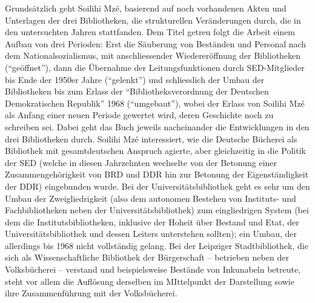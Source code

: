 \documentclass[a4paper,
fontsize=11pt,
oneside,
numbers=noperiodatend,
parskip=half-,
bibliography=totoc,
final
]{scrartcl}
\begin{document}
Grundsätzlich geht Soilihi Mzé, basierend auf noch vorhandenen Akten und
Unterlagen der drei Bibliotheken, die strukturellen Veränderungen durch,
die in den untersuchten Jahren stattfanden. Dem Titel getreu folgt die
Arbeit einem Aufbau von drei Perioden: Erst die Säuberung von Beständen
und Personal nach dem Nationalsozialismus, mit anschliessender
Wiedereröffnung der Bibliotheken (``geöffnet''), dann die Übernahme der
Leitungsfunktionen durch SED-Mitglieder bis Ende der 1950er Jahre
(``gelenkt'') und schliesslich der Umbau der Bibliotheken bis zum Erlass
der ``Bibliotheksverordnung der Deutschen Demokratischen Republik'' 1968
(``umgebaut''), wobei der Erlass von Soilihi Mzé als Anfang einer neuen
Periode gewertet wird, deren Geschichte noch zu schreiben sei. Dabei
geht das Buch jeweils nacheinander die Entwicklungen in den drei
Bibliotheken durch. Soilihi Mzé interessiert, wie die Deutsche Bücherei
als Bibliothek mit gesamtdeutschen Anspruch agierte, aber gleichzeitig
in die Politik der SED (welche in diesen Jahrzehnten wechselte von der
Betonung einer Zusammengehörigkeit von BRD und DDR hin zur Betonung der
Eigenständigkeit der DDR) eingebunden wurde. Bei der
Universitätsbibliothek geht es sehr um den Umbau der Zweigliedrigkeit
(also dem autonomen Bestehen von Instituts- und Fachbibliotheken neben
der Universitätsbibliothek) zum eingliedrigen System (bei dem die
Institutsbibliotheken, inklusive der Hoheit über Bestand und Etat, der
Universitätsbibliothek und dessen Leiters unterstehen sollten); ein
Umbau, der allerdings bis 1968 nicht vollständig gelang. Bei der
Leipziger Stadtbibliothek, die sich als Wissenschaftliche Bibliothek der
Bürgerschaft -- betrieben neben der Volksbücherei -- verstand und
beispielsweise Bestände von Inkunabeln betreute, steht vor allem die
Auflösung derselben im MIttelpunkt der Darstellung sowie ihre
Zusammenführung mit der Volksbücherei.
\end{document}
